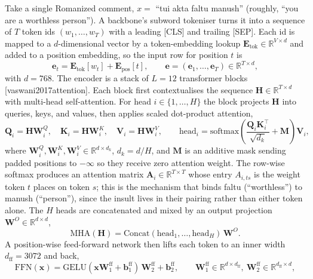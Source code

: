 \documentclass[11pt,a4paper]{article}
\def\citep#1{[#1]}%
\def\texttt#1{#1}%
\def\emph#1{#1}%
\begin{document}
Take a single Romanized comment, $x = $ \emph{``tui akta faltu manush''} (roughly, \emph{``you are a worthless person''}). A backbone's subword tokeniser turns it into a sequence of $T$ token ids $(w_1,\ldots,w_T)$ with a leading \texttt{[CLS]} and trailing \texttt{[SEP]}. Each id is mapped to a $d$-dimensional vector by a token-embedding lookup $\mathbf{E}_{\mathrm{tok}} \in \mathbb{R}^{V \times d}$ and added to a position embedding, so the input row for position $t$ is
\begin{equation}
\mathbf{e}_t = \mathbf{E}_{\mathrm{tok}}[w_t] + \mathbf{E}_{\mathrm{pos}}[t], \qquad \mathbf{e} = (\mathbf{e}_1,\ldots,\mathbf{e}_T) \in \mathbb{R}^{T \times d},
\label{eq:embed}
\end{equation}
with $d = 768$. The encoder is a stack of $L = 12$ transformer blocks \citep{vaswani2017attention}. Each block first contextualises the sequence $\mathbf{H} \in \mathbb{R}^{T \times d}$ with multi-head self-attention. For head $i \in \{1,\ldots,H\}$ the block projects $\mathbf{H}$ into queries, keys, and values, then applies scaled dot-product attention,
\begin{equation}
\mathbf{Q}_i = \mathbf{H}\mathbf{W}^Q_i,\quad \mathbf{K}_i = \mathbf{H}\mathbf{W}^K_i,\quad \mathbf{V}_i = \mathbf{H}\mathbf{W}^V_i,
\qquad
\mathrm{head}_i = \mathrm{softmax}\!\left(\frac{\mathbf{Q}_i \mathbf{K}_i^{\top}}{\sqrt{d_k}} + \mathbf{M}\right)\mathbf{V}_i,
\label{eq:attention}
\end{equation}
where $\mathbf{W}^Q_i, \mathbf{W}^K_i, \mathbf{W}^V_i \in \mathbb{R}^{d \times d_k}$, $d_k = d/H$, and $\mathbf{M}$ is an additive mask sending padded positions to $-\infty$ so they receive zero attention weight. The row-wise softmax produces an attention matrix $\mathbf{A}_i \in \mathbb{R}^{T \times T}$ whose entry $A_{i,ts}$ is the weight token $t$ places on token $s$; this is the mechanism that binds \emph{faltu} (``worthless'') to \emph{manush} (``person''), since the insult lives in their pairing rather than either token alone. The $H$ heads are concatenated and mixed by an output projection $\mathbf{W}^O \in \mathbb{R}^{d \times d}$,
\begin{equation}
\mathrm{MHA}(\mathbf{H}) = \mathrm{Concat}(\mathrm{head}_1,\ldots,\mathrm{head}_H)\,\mathbf{W}^O .
\label{eq:mha}
\end{equation}
A position-wise feed-forward network then lifts each token to an inner width $d_{\mathrm{ff}} = 3072$ and back,
\begin{equation}
\mathrm{FFN}(\mathbf{x}) = \mathrm{GELU}(\mathbf{x}\mathbf{W}_1^{\mathrm{ff}} + \mathbf{b}_1^{\mathrm{ff}})\,\mathbf{W}_2^{\mathrm{ff}} + \mathbf{b}_2^{\mathrm{ff}},
\qquad \mathbf{W}_1^{\mathrm{ff}} \in \mathbb{R}^{d \times d_{\mathrm{ff}}},\ \mathbf{W}_2^{\mathrm{ff}} \in \mathbb{R}^{d_{\mathrm{ff}} \times d},
\label{eq:ffn}
\end{equation}
\end{document}
